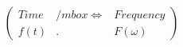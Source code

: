 \documentclass[preview]{standalone}
\begin{document}
\begin{align*}
\left( \begin{array}{cl} Time & /mbox{\Longleftrightarrow} & Frequency \\ f(t) & . & F(\omega) \end{array} \right)
\end{align*}
\end{document}
